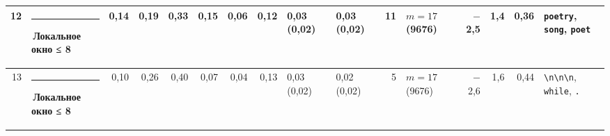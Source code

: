 \documentclass[10pt]{article}
\begin{document}
\begin{minipage}{\linewidth}
\begin{center}
{\begin{tabular}{|r|l|r|r|r|r|r|r|l|l|r|l|r|r|r|l|}
12 & \textcolor[HTML]{1BAF7A}{\rule{0.62em}{0.62em}}\,\textbf{Локальное окно ≤ 8} & 0,14 & 0,19 & 0,33 & 0,15 & 0,06 & 0,12 & 0,03 (0,02) & 0,03 (0,02) & 11 & $m{=}17$ (9676) & $-$2,5 & 1,4 & 0,36 & \texttt{\textvisiblespace{}poetry}, \texttt{\textvisiblespace{}song}, \texttt{\textvisiblespace{}poet} \\ \hline
13 & \textcolor[HTML]{1BAF7A}{\rule{0.62em}{0.62em}}\,\textbf{Локальное окно ≤ 8} & 0,10 & 0,26 & 0,40 & 0,07 & 0,04 & 0,13 & 0,03 (0,02) & 0,02 (0,02) & 5 & $m{=}17$ (9676) & $-$2,6 & 1,6 & 0,44 & \texttt{\textvisiblespace{}\textbackslash{}n\textbackslash{}n\textbackslash{}n}, \texttt{\textvisiblespace{}while}, \texttt{\textvisiblespace{}.} \\ \hline
\hline\end{tabular}}\end{center}
\end{minipage}
\par\vspace{0.4em}
\end{document}
